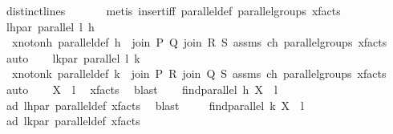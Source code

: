 \begin{isabellebody}
\ distinct{\isacharunderscore}{\kern0pt}lines\ \isanewline
\ \ \ \ \isamarkupfalse%
\ {\isacharparenleft}{\kern0pt}metis\ insert{\isacharunderscore}{\kern0pt}iff\ parallel{\isacharunderscore}{\kern0pt}def\ parallel{\isacharunderscore}{\kern0pt}groups\ xfacts{\isacharparenright}{\kern0pt}\isanewline
\ \ \isamarkupfalse%
\ lh{\isacharunderscore}{\kern0pt}par{\isacharcolon}{\kern0pt}\ {\isachardoublequoteopen}parallel\ l\ h{\isachardoublequoteclose}\ \ \isanewline
\ \ \isamarkupfalse%
\ {}\ x{\isacharunderscore}{\kern0pt}not{\isacharunderscore}{\kern0pt}on{\isacharunderscore}{\kern0pt}h\ parallel{\isacharunderscore}{\kern0pt}def\ {\isacartoucheopen}h\ {\isasymin}\ {\isacharbraceleft}{\kern0pt}join\ P\ Q{\isacharcomma}{\kern0pt}\ join\ R\ S{\isacharbraceright}{\kern0pt}{\isacartoucheclose}\ assms\ ch\ parallel{\isacharunderscore}{\kern0pt}groups\ xfacts\ \isamarkupfalse%
\ auto\isanewline
\ \ \isamarkupfalse%
\ lk{\isacharunderscore}{\kern0pt}par{\isacharcolon}{\kern0pt}\ {\isachardoublequoteopen}parallel\ l\ k{\isachardoublequoteclose}\ \isanewline
\ \ \isamarkupfalse%
\ {}\ x{\isacharunderscore}{\kern0pt}not{\isacharunderscore}{\kern0pt}on{\isacharunderscore}{\kern0pt}k\ parallel{\isacharunderscore}{\kern0pt}def\ {\isacartoucheopen}k\ {\isasymin}\ {\isacharbraceleft}{\kern0pt}join\ P\ R{\isacharcomma}{\kern0pt}\ join\ Q\ S{\isacharbraceright}{\kern0pt}{\isacartoucheclose}\ assms\ ch\ parallel{\isacharunderscore}{\kern0pt}groups\ xfacts\ \isamarkupfalse%
\ auto\isanewline
\ \ \isamarkupfalse%
\ {\isachardoublequoteopen}X\ {\isasymlhd}\ l{\isachardoublequoteclose}\ \isamarkupfalse%
\ xfacts\ \isamarkupfalse%
\ blast\isanewline
\isanewline
\ \ \isamarkupfalse%
\ {\isachardoublequoteopen}find{\isacharunderscore}{\kern0pt}parallel\ h\ X\ {\isacharequal}{\kern0pt}\ l{\isachardoublequoteclose}\ \isamarkupfalse%
\ a{}d\ lh{\isacharunderscore}{\kern0pt}par\ parallel{\isacharunderscore}{\kern0pt}def\ xfacts\ \isamarkupfalse%
\ blast\ \isanewline
\ \ \isamarkupfalse%
\ {\isachardoublequoteopen}find{\isacharunderscore}{\kern0pt}parallel\ k\ X\ {\isacharequal}{\kern0pt}\ l{\isachardoublequoteclose}\ \isamarkupfalse%
\ a{}d\ lk{\isacharunderscore}{\kern0pt}par\ parallel{\isacharunderscore}{\kern0pt}def\ xfacts\ \isamarkupfalse%

\end{isabellebody}
